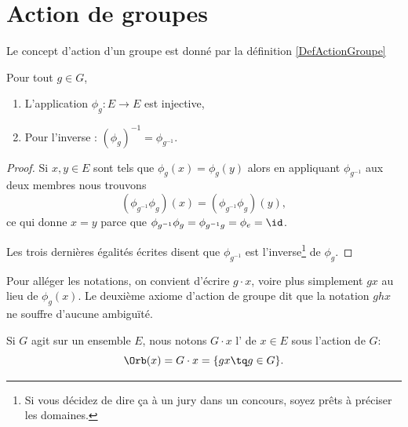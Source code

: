 \section{Action de groupes}
Le concept d'action d'un groupe est donné par la définition \ref{DefActionGroupe}

\begin{lemma}
	Pour tout \( g\in G\),
	\begin{enumerate}
		\item
		      L'application \( \phi_g\colon E\to E\) est injective,
		\item
		      Pour l'inverse : \( (\phi_g)^{-1}=\phi_{g^{-1}}\).
	\end{enumerate}
\end{lemma}

\begin{proof}
	Si \( x,y\in E\) sont tels que \( \phi_g(x)=\phi_g(y)\) alors en appliquant \( \phi_{g^{-1}}\) aux deux membres nous trouvons
	\begin{equation}
		(\phi_{g^{-1}}\phi_g)(x)=(\phi_{g^{-1}}\phi_g)(y),
	\end{equation}
	ce qui donne \( x=y\) parce que \( \phi_{g^{-1}}\phi_g=\phi_{g^{-1}g}=\phi_e=\id\).

	Les trois dernières égalités écrites disent que \( \phi_{g^{-1}}\) est l'inverse\footnote{Si vous décidez de dire ça à un jury dans un concours, soyez prêts à préciser les domaines.} de \( \phi_g\).
\end{proof}

Pour alléger les notations, on convient d'écrire \( g \cdot x\), voire plus simplement \( gx\) au lieu de \( \phi_g(x) \). Le deuxième axiome d'action de groupe dit que la notation \( ghx\) ne souffre d'aucune ambiguïté.

\begin{definition}[Orbite]      \label{DEFooMZXFooXbwGjj}
	Si \( G\) agit sur un ensemble \( E\), nous notons \( G\cdot x\) l' de \( x\in E\) sous l'action de \( G\):
	\begin{equation*}
		\Orb(x)=G\cdot x = \{ gx \tq g \in G\}.
	\end{equation*}
\end{definition}

